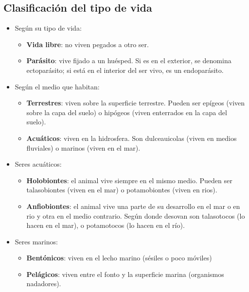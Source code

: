 \subsection{Clasificación del tipo de vida}
\begin{itemize}[itemsep=0pt,parsep=0pt,topsep=0pt,partopsep=0pt]
    \item Según su tipo de vida:
    \begin{itemize}[itemsep=0pt,parsep=0pt,topsep=0pt,partopsep=0pt]
        \item \textbf{Vida libre}: no viven pegados a otro ser.
        \item\textbf{Parásito}: vive fijado a un huésped. Si es en el exterior, se denomina ectoparásito; si está en el interior del ser vivo, es un endoparásito.
    \end{itemize}
    \item Según el medio que habitan:
    \begin{itemize}[itemsep=0pt,parsep=0pt,topsep=0pt,partopsep=0pt]
        \item \textbf{Terrestres}: viven sobre la superficie terrestre. Pueden ser epígeos (viven sobre la capa del suelo) o hipógeos (viven enterrados en la capa del suelo).
        \item\textbf{Acuáticos}: viven en la hidrosfera. Son dulceauicolas (viven en medios fluviales) o marinos (viven en el mar).
    \end{itemize}
    \item Seres acuáticos:
    \begin{itemize}[itemsep=0pt,parsep=0pt,topsep=0pt,partopsep=0pt]
        \item \textbf{Holobiontes}: el animal vive siempre en el mismo medio. Pueden ser talasobiontes (viven en el mar) o potamobiontes (viven en rios).
        \item\textbf{Anfiobiontes}: el animal vive una parte de su desarrollo en el mar o en rio y otra en el medio contrario. Según donde desovan son talasotocos (lo hacen en el mar), o potamotocos (lo hacen en el río).
    \end{itemize}
    \item Seres marinos:
    \begin{itemize}[itemsep=0pt,parsep=0pt,topsep=0pt,partopsep=0pt]
        \item \textbf{Bentónicos}: viven en el lecho marino (sésiles o poco móviles)
        \item\textbf{Pelágicos}: viven entre el fonto y la superficie marina (organismos nadadores).

\end{itemize}
\end{itemize}
